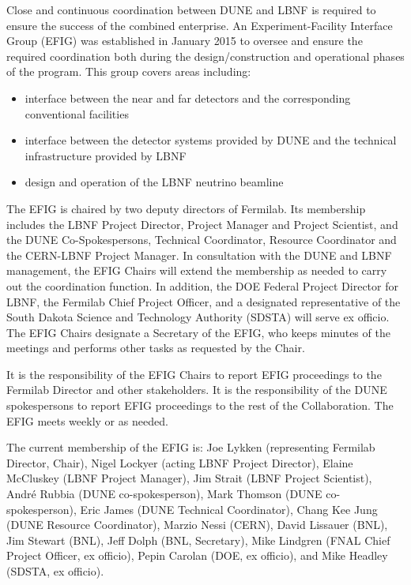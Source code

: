 Close and continuous coordination between DUNE and LBNF is
required to ensure the success of the combined enterprise.
An Experiment-Facility Interface Group (EFIG) was established
in January 2015 to oversee and ensure the required coordination
both during the design/construction and operational
phases of the program. This group covers areas including:
\begin{itemize}
\item  interface between the near and far detectors and the
corresponding conventional facilities
\item interface between the detector systems provided by
DUNE and the technical infrastructure provided by LBNF
\item design and operation of the LBNF neutrino beamline
\end{itemize}

The EFIG is chaired by two deputy directors of Fermilab.
Its membership includes the LBNF Project Director, Project Manager and Project Scientist, and 
the DUNE Co-Spokespersons, Technical Coordinator, Resource Coordinator and the CERN-LBNF Project Manager.
In consultation with the DUNE and LBNF management, the EFIG Chairs will
extend the membership as needed 
to carry out the coordination
function. In addition, the DOE Federal Project Director for LBNF,
the Fermilab Chief Project Officer, and a designated representative
of the South Dakota Science and Technology Authority (SDSTA) will
serve ex officio. The EFIG Chairs designate a Secretary of the EFIG,
who keeps minutes of the meetings and performs other tasks as
requested by the Chair.

It is the responsibility of the EFIG Chairs to report EFIG proceedings
to the Fermilab Director and other stakeholders. It is the responsibility
of the DUNE spokespersons to report EFIG proceedings to the rest of
the Collaboration. The EFIG meets weekly or as needed.

The current membership of the EFIG is:
%
Joe Lykken (representing Fermilab Director, Chair),
Nigel Lockyer (acting LBNF Project Director),
Elaine McCluskey (LBNF Project Manager),
Jim Strait (LBNF Project Scientist),
Andr\'e Rubbia (DUNE co-spokesperson),
Mark Thomson (DUNE co-spokesperson),
Eric James (DUNE Technical Coordinator),
Chang Kee Jung (DUNE Resource Coordinator),
Marzio Nessi (CERN),
David Lissauer (BNL),
Jim Stewart (BNL),
Jeff Dolph (BNL, Secretary),
Mike Lindgren (FNAL Chief Project Officer, ex officio),
Pepin Carolan (DOE, ex officio), and 
Mike Headley (SDSTA, ex officio).


